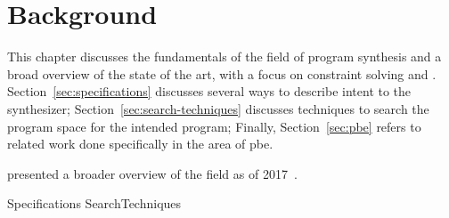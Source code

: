 \chapter{Background}
\label{chapter:background}

This chapter discusses the fundamentals of the field of program synthesis and a
broad overview of the state of the art, with a focus on constraint solving and
.
Section~\ref{sec:specifications} discusses several ways to describe intent to
the synthesizer; %
Section~\ref{sec:search-techniques} discusses techniques to search the program
space for the intended program; %
Finally, Section~\ref{sec:pbe} refers to related work done specifically in the
area of \gls{pbe}.

\citeauthor{Gulwani2017} presented a broader overview of the field as of
2017~\cite{Gulwani2017}.

{Specifications}
{SearchTechniques}
